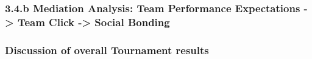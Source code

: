 

%












\subsubsection{3.4.b Mediation Analysis: Team Performance Expectations -> Team Click -> Social Bonding}






\subsubsection{Discussion of overall Tournament results}
